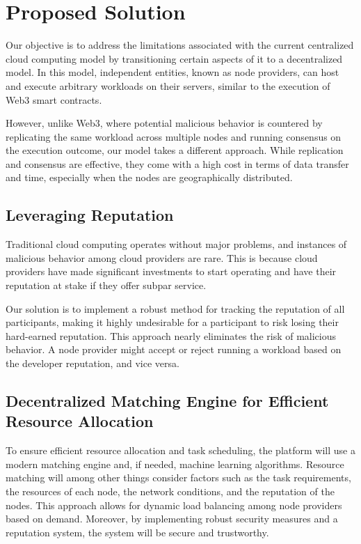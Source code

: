 \section{Proposed Solution}
\label{sec:proposed_solution}

Our objective is to address the limitations associated with the current centralized cloud computing model by transitioning certain aspects of it to a decentralized model. In this model, independent entities, known as node providers, can host and execute arbitrary workloads on their servers, similar to the execution of Web3 smart contracts.

However, unlike Web3, where potential malicious behavior is countered by replicating the same workload across multiple nodes and running consensus on the execution outcome, our model takes a different approach. While replication and consensus are effective, they come with a high cost in terms of data transfer and time, especially when the nodes are geographically distributed.

\subsection{Leveraging Reputation}

Traditional cloud computing operates without major problems, and instances of malicious behavior among cloud providers are rare. This is because cloud providers have made significant investments to start operating and have their reputation at stake if they offer subpar service.

Our solution is to implement a robust method for tracking the reputation of all participants, making it highly undesirable for a participant to risk losing their hard-earned reputation. This approach nearly eliminates the risk of malicious behavior. A node provider might accept or reject running a workload based on the developer reputation, and vice versa.

\subsection{Decentralized Matching Engine for Efficient Resource Allocation}

To ensure efficient resource allocation and task scheduling, the platform will use a modern matching engine and, if needed, machine learning algorithms. Resource matching will among other things consider factors such as the task requirements, the resources of each node, the network conditions, and the reputation of the nodes.
This approach allows for dynamic load balancing among node providers based on demand. Moreover, by implementing robust security measures and a reputation system, the system will be secure and trustworthy.

